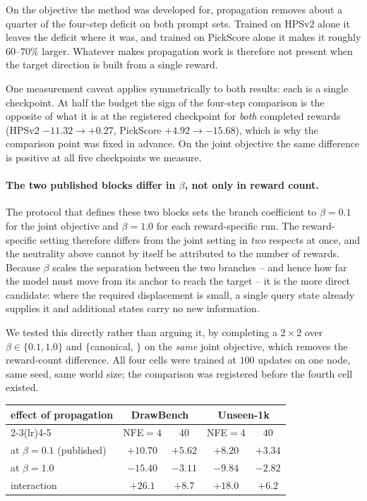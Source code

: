 

On the objective the method was developed for, propagation removes about a quarter of the
four-step deficit on both prompt sets. Trained on HPSv2 alone it leaves the deficit where it
was, and trained on PickScore alone it makes it roughly $60$--$70\%$ larger. Whatever makes
propagation work is therefore not present when the target direction is built from a single
reward.

One measurement caveat applies symmetrically to both results: each is a single checkpoint.
At half the budget the sign of the four-step comparison is the opposite of what it is at the
registered checkpoint for \emph{both} completed rewards (HPSv2 $-11.32\to+0.27$, PickScore
$+4.92\to-15.68$), which is why the comparison point was fixed in advance. On the joint
objective the same difference is positive at all five checkpoints we measure.

\paragraph{The two published blocks differ in $\beta$, not only in reward count.}
The protocol that defines these two blocks sets the branch coefficient to $\beta=0.1$ for
the joint objective and $\beta=1.0$ for each reward-specific run. The reward-specific
setting therefore differs from the joint setting in \emph{two} respects at once, and the
neutrality above cannot by itself be attributed to the number of rewards. Because $\beta$
scales the separation between the two branches -- and hence how far the model must move
from its anchor to reach the target -- it is the more direct candidate: where the required
displacement is small, a single query state already supplies it and additional states carry
no new information.

We tested this directly rather than arguing it, by completing a $2\times2$ over
$\beta\in\{0.1,1.0\}$ and $\{$canonical, \MSP$\}$ on the \emph{same} joint objective, which
removes the reward-count difference. All four cells were trained at $100$ updates on one
node, same seed, same world size; the comparison was registered before the fourth cell
existed.

\begin{center}
\begin{tabular}{lcccc}
\toprule
effect of propagation & \multicolumn{2}{c}{DrawBench} & \multicolumn{2}{c}{Unseen-1k}\\
\cmidrule(lr){2-3}\cmidrule(lr){4-5}
 & NFE$=4$ & $40$ & NFE$=4$ & $40$\\
\midrule
at $\beta=0.1$ (published) & $+10.70$ & $+5.62$ & $+8.20$ & $+3.34$\\
at $\beta=1.0$             & $-15.40$ & $-3.11$ & $-9.84$ & $-2.82$\\
\midrule
interaction                & $\mathbf{+26.1}$ & $+8.7$ & $\mathbf{+18.0}$ & $+6.2$\\
\bottomrule
\end{tabular}
\end{center}

